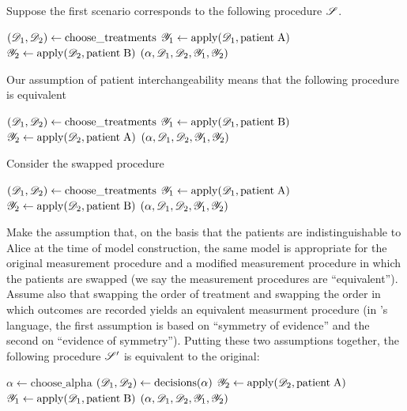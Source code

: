 Suppose the first scenario corresponds to the following procedure $\mathscr{S}$.
\begin{algorithmic}
    \State $(\mathscr{D}_1,\mathscr{D}_2) \gets \mathrm{choose\_treatments}$
    \State $\mathscr{Y}_1\gets \mathrm{apply}(\mathscr{D}_1,\mathrm{patient\;A})$
    \State $\mathscr{Y}_2\gets \mathrm{apply}(\mathscr{D}_2,\mathrm{patient\;B})$
    \State \Return $(\alpha,\mathscr{D}_1,\mathscr{D}_2,\mathscr{Y}_1,\mathscr{Y}_2)$
    \EndProcedure
\end{algorithmic}

Our assumption of patient interchangeability means that the following procedure is equivalent

\begin{algorithmic}
    \State $(\mathscr{D}_1,\mathscr{D}_2) \gets \mathrm{choose\_treatments}$
    \State $\mathscr{Y}_1\gets \mathrm{apply}(\mathscr{D}_1,\mathrm{patient\;B})$
    \State $\mathscr{Y}_2\gets \mathrm{apply}(\mathscr{D}_2,\mathrm{patient\;A})$
    \State \Return $(\alpha,\mathscr{D}_1,\mathscr{D}_2,\mathscr{Y}_1,\mathscr{Y}_2)$
    \EndProcedure
\end{algorithmic}

Consider the swapped procedure

\begin{algorithmic}
    \State $(\mathscr{D}_1,\mathscr{D}_2) \gets \mathrm{choose\_treatments}$
    \State $\mathscr{Y}_1\gets \mathrm{apply}(\mathscr{D}_1,\mathrm{patient\;A})$
    \State $\mathscr{Y}_2\gets \mathrm{apply}(\mathscr{D}_2,\mathrm{patient\;B})$
    \State \Return $(\alpha,\mathscr{D}_1,\mathscr{D}_2,\mathscr{Y}_1,\mathscr{Y}_2)$
    \EndProcedure
\end{algorithmic}


Make the assumption that, on the basis that the patients are indistinguishable to Alice at the time of model construction, the same model is appropriate for the original measurement procedure and a modified measurement procedure in which the patients are swapped (we say the measurement procedures are ``equivalent''). Assume also that swapping the order of treatment and swapping the order in which outcomes are recorded yields an equivalent measurment procedure (in \citet{walley_statistical_1991}'s language, the first assumption is based on ``symmetry of evidence'' and the second on ``evidence of symmetry''). Putting these two assumptions together, the following procedure $\mathscr{S}'$ is equivalent to the original:

\begin{algorithmic}
    \State $\alpha \gets \mathrm{choose\_alpha}$
    \State $(\mathscr{D}_1,\mathscr{D}_2) \gets \mathrm{decisions}(\alpha)$
    \State $\mathscr{Y}_2\gets \mathrm{apply}(\mathscr{D}_2,\mathrm{patient\;A})$
    \State $\mathscr{Y}_1\gets \mathrm{apply}(\mathscr{D}_1,\mathrm{patient\;B})$
    \State \Return $(\alpha,\mathscr{D}_1,\mathscr{D}_2,\mathscr{Y}_1,\mathscr{Y}_2)$
    \EndProcedure
\end{algorithmic}

